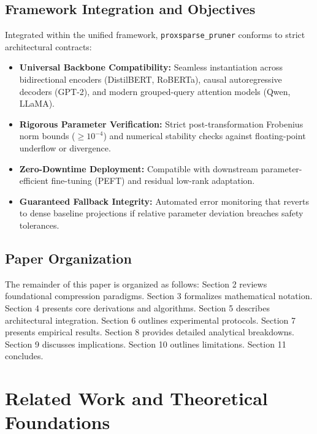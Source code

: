 \subsection{Framework Integration and Objectives}
Integrated within the unified framework, \texttt{proxsparse\_pruner} conforms to strict architectural contracts:
\begin{itemize}
\item \textbf{Universal Backbone Compatibility:} Seamless instantiation across bidirectional encoders (DistilBERT, RoBERTa), causal autoregressive decoders (GPT-2), and modern grouped-query attention models (Qwen, LLaMA).
\item \textbf{Rigorous Parameter Verification:} Strict post-transformation Frobenius norm bounds ($\ge 10^{-4}$) and numerical stability checks against floating-point underflow or divergence.
\item \textbf{Zero-Downtime Deployment:} Compatible with downstream parameter-efficient fine-tuning (PEFT) and residual low-rank adaptation.
\item \textbf{Guaranteed Fallback Integrity:} Automated error monitoring that reverts to dense baseline projections if relative parameter deviation breaches safety tolerances.
\end{itemize}

\subsection{Paper Organization}
The remainder of this paper is organized as follows: Section 2 reviews foundational compression paradigms. Section 3 formalizes mathematical notation. Section 4 presents core derivations and algorithms. Section 5 describes architectural integration. Section 6 outlines experimental protocols. Section 7 presents empirical results. Section 8 provides detailed analytical breakdowns. Section 9 discusses implications. Section 10 outlines limitations. Section 11 concludes.


\section{Related Work and Theoretical Foundations}

